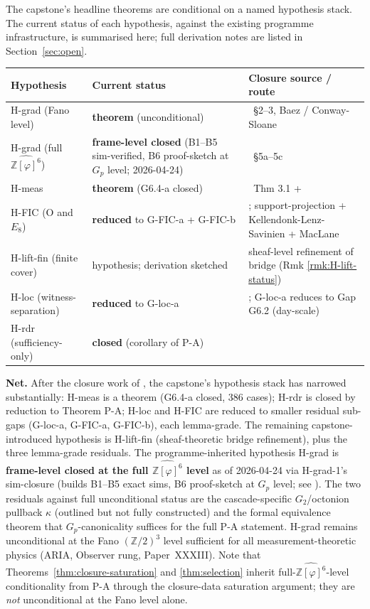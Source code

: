 \documentclass[11pt, a4paper]{amsart}
\theoremstyle{definition}
\newcommand{\Z}{\mathbb{Z}}
\begin{document}
The capstone's headline theorems are conditional on a named
hypothesis stack. The current status of each hypothesis,
against the existing programme infrastructure, is summarised
here; full derivation notes are listed in
Section~\ref{sec:open}.

\begin{center}
\small
\begin{tabular}{l|l|l}
Hypothesis & Current status & Closure source / route \\ \hline
H-grad (Fano level) & \textbf{theorem} (unconditional) & \cite{CascadeFanoLift}~\S 2--3, Baez / Conway-Sloane \\
H-grad (full $\widehat{\Z[\varphi]^6}$) & \textbf{frame-level closed} (B1--B5 sim-verified, B6 proof-sketch at $G_p$ level; 2026-04-24) & \cite{CascadeHGrad1}~\S5a--5c \\
H-meas & \textbf{theorem} (G6.4-a closed) & \cite{CascadeQOBridge}~Thm 3.1 + \cite{CascadeG64aClosure} \\
H-FIC (O and $E_8$) & \textbf{reduced} to G-FIC-a + G-FIC-b & \cite{CascadeHFICClosure}; support-projection + Kellendonk-Lenz-Savinien + MacLane \\
H-lift-fin (finite cover) & hypothesis; derivation sketched & sheaf-level refinement of bridge (Rmk \ref{rmk:H-lift-status}) \\
H-loc (witness-separation) & \textbf{reduced} to G-loc-a & \cite{CascadeHlocClosure}; G-loc-a reduces to Gap G6.2 (day-scale) \\
H-rdr (sufficiency-only) & \textbf{closed} (corollary of P-A) & \cite{CascadeHrdrClosure} \\
\end{tabular}
\end{center}

\textbf{Net.} After the closure work of
\cite{CascadeG64aClosure, CascadeHrdrClosure,
CascadeHlocClosure, CascadeHFICClosure}, the capstone's
hypothesis stack has narrowed substantially: H-meas is a
theorem (G6.4-a closed, 386 cases); H-rdr is closed by
reduction to Theorem P-A; H-loc and H-FIC are reduced to
smaller residual sub-gaps (G-loc-a, G-FIC-a, G-FIC-b), each
lemma-grade. The remaining capstone-introduced hypothesis is
H-lift-fin (sheaf-theoretic bridge refinement), plus the
three lemma-grade residuals. The programme-inherited
hypothesis H-grad is \textbf{frame-level closed at the full
$\widehat{\Z[\varphi]^6}$ level} as of 2026-04-24 via
H-grad-1's sim-closure (builds B1--B5 exact sims, B6
proof-sketch at $G_p$ level; see \cite{CascadeHGrad1}). The
two residuals against full unconditional status are the
cascade-specific $G_2$/octonion pullback $\kappa$ (outlined
but not fully constructed) and the formal equivalence
theorem that $G_p$-canonicality suffices for the full P-A
statement. H-grad remains unconditional at the Fano
$(\Z/2)^3$ level sufficient for all measurement-theoretic
physics (ARIA, Observer rung, Paper~XXXIII). Note that
Theorems~\ref{thm:closure-saturation} and \ref{thm:selection}
inherit full-$\widehat{\Z[\varphi]^6}$-level conditionality
from P-A through the closure-data saturation argument; they
are \emph{not} unconditional at the Fano level alone.
\end{document}
